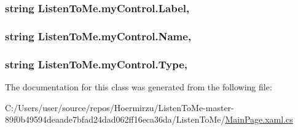 \subsubsection[{\texorpdfstring{Label}{Label}}]{\setlength{\rightskip}{0pt plus 5cm}string Listen\+To\+Me.\+my\+Control.\+Label\hspace{0.3cm}{\ttfamily [get]}, {\ttfamily [set]}}\hypertarget{class_listen_to_me_1_1my_control_a38784cdc14e4291a6724c78305785472}{}\label{class_listen_to_me_1_1my_control_a38784cdc14e4291a6724c78305785472}
\subsubsection[{\texorpdfstring{Name}{Name}}]{\setlength{\rightskip}{0pt plus 5cm}string Listen\+To\+Me.\+my\+Control.\+Name\hspace{0.3cm}{\ttfamily [get]}, {\ttfamily [set]}}\hypertarget{class_listen_to_me_1_1my_control_a22e3a9daa8044a66e4b4c3771e5b8184}{}\label{class_listen_to_me_1_1my_control_a22e3a9daa8044a66e4b4c3771e5b8184}
\subsubsection[{\texorpdfstring{Type}{Type}}]{\setlength{\rightskip}{0pt plus 5cm}string Listen\+To\+Me.\+my\+Control.\+Type\hspace{0.3cm}{\ttfamily [get]}, {\ttfamily [set]}}\hypertarget{class_listen_to_me_1_1my_control_afd9026762fe27b7322e1546129523fbc}{}\label{class_listen_to_me_1_1my_control_afd9026762fe27b7322e1546129523fbc}


The documentation for this class was generated from the following file\+:\begin{DoxyCompactItemize}
\item 
C\+:/\+Users/user/source/repos/\+Hoermirzu/\+Listen\+To\+Me-\/master-\/89f0b49594deaade7bfad24dad062ff16eca36da/\+Listen\+To\+Me/\hyperlink{_main_page_8xaml_8cs}{Main\+Page.\+xaml.\+cs}\end{DoxyCompactItemize}
